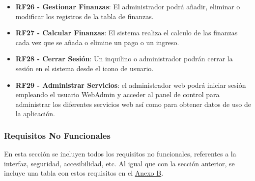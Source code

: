 \begin{itemize}
	\item \textbf{RF26 - Gestionar Finanzas}: El administrador podrá añadir, eliminar o modificar los registros de la tabla de finanzas.
	\item \textbf{RF27 - Calcular Finanzas}: El sistema realiza el calculo de las finanzas cada vez que se añada o elimine un pago o un ingreso.
	\item \textbf{RF28 - Cerrar Sesión}: Un inquilino o administrador podrán cerrar la sesión en el sistema desde el icono de usuario.
	
	\item \textbf{RF29 - Administrar Servicios}: el administrador web podrá iniciar sesión empleando el usuario WebAdmin y acceder al panel de control para administrar los diferentes servicios web así como para obtener datos de uso de la aplicación.
\end{itemize}

\subsubsection{Requisitos No Funcionales}
En esta sección se incluyen todos los requisitos no funcionales, referentes a la interfaz, seguridad, accesibilidad, etc. Al igual que con la sección anterior, se incluye una tabla con estos requisitos en el \hyperref[sec:apenB]{Anexo B}.

